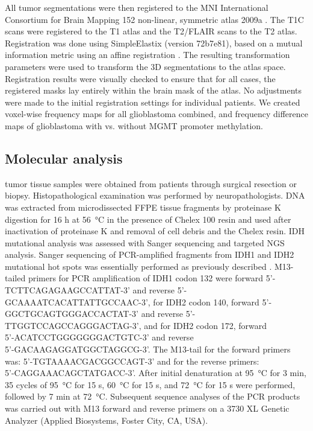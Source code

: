 All \gls{tumor} segmentations were then registered to the \gls{MNI} International Consortium for Brain Mapping 152 non-linear, symmetric atlas 2009a \autocite{fonov2011unbiased, fonov2009unbiased}.
The \gls{T1C} scans were registered to the \gls{T1} atlas and the \gls{T2}/\gls{FLAIR} scans to the \gls{T2} atlas.
Registration was done using SimpleElastix (version 72b7e81), based on a mutual information metric using an affine registration \autocite{marstal2016simpleelastix}.
The resulting transformation parameters were used to transform the 3D segmentations to the atlas space.
Registration results were visually checked to ensure that for all cases, the registered masks lay entirely within the brain mask of the atlas.
No adjustments were made to the initial registration settings for individual patients.
We created voxel-wise frequency maps for all glioblastoma combined, and frequency difference maps of glioblastoma with vs. without \gls{MGMT} promoter methylation.

\subsection{Molecular analysis}

\Gls{tumor} tissue samples were obtained from patients through surgical resection or biopsy.
Histopathological examination was performed by neuropathologists.
DNA was extracted from microdissected \gls{FFPE} tissue fragments by proteinase K digestion for 16 h at \SI{56}{\celsius} in the presence of  Chelex 100 resin and used after inactivation of proteinase K and removal of cell debris and the Chelex resin.
\gls{IDH} mutational analysis was assessed with Sanger sequencing and targeted \gls{NGS} analysis.
Sanger sequencing of PCR-amplified fragments from \gls{IDH}1 and \gls{IDH}2 mutational hot spots was essentially performed as previously described \autocite{vandenbent2013interlaboratory}.
M13-tailed primers for PCR amplification of IDH1 codon 132 were forward {5'-TCTTCAGAGAAGCCATTAT-3'} and reverse {5'-GCAAAATCACATTATTGCCAAC-3'}, for IDH2 codon 140, forward {5'-GGCTGCAGTGGGACCACTAT-3'} and reverse {5'-TTGGTCCAGCCAGGGACTAG-3'}, and for IDH2 codon 172, forward \\ {5'-ACATCCTGGGGGGGACTGTC-3'} and reverse \\{5'-GACAAGAGGATGGCTAGGCG-3'}.
The M13-tail for the forward primers was: {5'-TGTAAAACGACGGCCAGT-3'} and for the reverse primers: \\{5'-CAGGAAACAGCTATGACC-3'}.
After initial denaturation at \SI{95}{\celsius} for 3 min, 35 cycles of \SI{95}{\celsius} for 15 s, \SI{60}{\celsius} for 15 s, and \SI{72}{\celsius} for 15 s were performed, followed by 7 min at \SI{72}{\celsius}.
Subsequent sequence analyses of the PCR products was carried out with M13 forward and reverse primers on a 3730 XL Genetic Analyzer (Applied Biosystems, Foster City, CA, USA).

